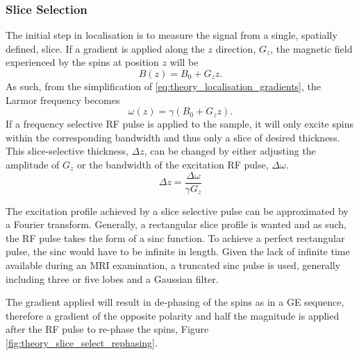 \subsubsection{Slice Selection}
The initial step in localisation is to measure the signal from a single, spatially defined, slice. If a gradient is applied along the $z$ direction, $G_z$, the magnetic field experienced by the spins at position $z$ will be
\begin{equation}
B\left( z\right)  = B_0 + G_zz.
\end{equation}
As such, from the simplification of \eqref{eq:theory_localisation_gradients}, the Larmor frequency becomes
\begin{equation}
\omega\left( z\right)  = \gamma\left( B_0 + G_zz\right).
\end{equation}
If a frequency selective \ac{RF} pulse is applied to the sample, it will only excite spins within the corresponding bandwidth and thus only a slice of desired thickness. This slice-selective thickness, $\Delta z$, can be changed by either adjusting the amplitude of $G_z$ or the bandwidth of the excitation \ac{RF} pulse, $\Delta \omega$.
\begin{equation}
\Delta z = \frac{\Delta \omega}{\gamma G_z}
\end{equation}

The excitation profile achieved by a slice selective pulse can be approximated by a Fourier transform. Generally, a rectangular slice profile is wanted and as such, the \ac{RF} pulse takes the form of a sinc function. To achieve a perfect rectangular pulse, the sinc would have to be infinite in length. Given the lack of infinite time available during an \ac{MRI} examination, a truncated sinc pulse is used, generally including three or five lobes and a Gaussian filter.

The gradient applied will result in de-phasing of the spins as in a \ac{GE} sequence, therefore a gradient of the opposite polarity and half the magnitude is applied after the \ac{RF} pulse to re-phase the spins, Figure \ref{fig:theory_slice_select_rephasing}.


